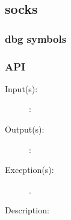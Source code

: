 %
%
%
%
%              

\subsection{socks}
\label{socks}

\subsubsection{dbg symbols}

\subsubsection{API}
\begin{description}
\label{socks_}
\item[{\cfunc[]{socks\_}{}}: ]
	\begin{description}\item[]
	\item[Input(s): ]
		\begin{description}\item[]
		\item[: ]
		\end{description}
	\item[Output(s): ]
		\begin{description}\item[]
		\item[: ]
		\end{description}
	\item[Exception(s): ]
		\begin{description}\item[]
		\item[.]
		\end{description}
	\item[Description: ]
	\end{description}
\end{description}

